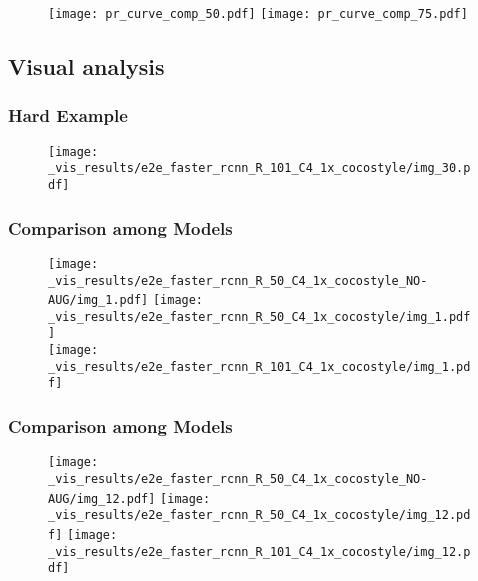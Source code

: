\documentclass{beamer}
\begin{document}
		\begin{frame}%
			\begin{figure}[htb!]
				\centering
				\texttt{[image: pr\_curve\_comp\_50.pdf]}
				\texttt{[image: pr\_curve\_comp\_75.pdf]}
				\label{fig:prec-rec_curve}
			\end{figure}
		\end{frame}


	\subsection{Visual analysis}

		\begin{frame}\frametitle{Hard Example}
			\begin{figure}[h!]
				\centering
				\texttt{[image: \_vis\_results/e2e\_faster\_rcnn\_R\_101\_C4\_1x\_cocostyle/img\_30.pdf]}
				\label{fig:hard}
			\end{figure}
		\end{frame}


		\begin{frame}\frametitle{Comparison among Models}
			\begin{figure}[htb!]
				\centering
				\texttt{[image: \_vis\_results/e2e\_faster\_rcnn\_R\_50\_C4\_1x\_cocostyle\_NO-AUG/img\_1.pdf]}
				\texttt{[image: \_vis\_results/e2e\_faster\_rcnn\_R\_50\_C4\_1x\_cocostyle/img\_1.pdf]}\\
				\vspace{3mm}
				\texttt{[image: \_vis\_results/e2e\_faster\_rcnn\_R\_101\_C4\_1x\_cocostyle/img\_1.pdf]}
  			\label{fig:improv_1}
			\end{figure}
		\end{frame}


		\begin{frame}\frametitle{Comparison among Models}
			\begin{figure}[htb!]
				\centering
				\texttt{[image: \_vis\_results/e2e\_faster\_rcnn\_R\_50\_C4\_1x\_cocostyle\_NO-AUG/img\_12.pdf]}
				\texttt{[image: \_vis\_results/e2e\_faster\_rcnn\_R\_50\_C4\_1x\_cocostyle/img\_12.pdf]}
				\vspace{3mm}
				\texttt{[image: \_vis\_results/e2e\_faster\_rcnn\_R\_101\_C4\_1x\_cocostyle/img\_12.pdf]}
  			\label{fig:improv_2}
			\end{figure}
		\end{frame}
\end{document}
